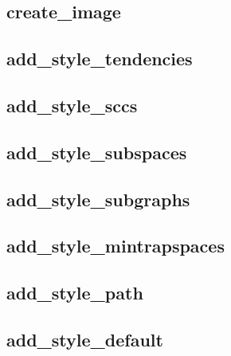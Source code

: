 \documentclass[letterpaper,10pt,english]{sphinxmanual}
\begin{document}
\subsection{create\_image}
\label{\detokenize{StateTransitionGraphs:create-image}}\label{\detokenize{StateTransitionGraphs:stgs-create-image}}

\subsection{add\_style\_tendencies}
\label{\detokenize{StateTransitionGraphs:id22}}\label{\detokenize{StateTransitionGraphs:add-style-tendencies}}

\subsection{add\_style\_sccs}
\label{\detokenize{StateTransitionGraphs:add-style-sccs}}\label{\detokenize{StateTransitionGraphs:stgs-add-style-sccs}}

\subsection{add\_style\_subspaces}
\label{\detokenize{StateTransitionGraphs:add-style-subspaces}}\label{\detokenize{StateTransitionGraphs:id23}}

\subsection{add\_style\_subgraphs}
\label{\detokenize{StateTransitionGraphs:add-style-subgraphs}}\label{\detokenize{StateTransitionGraphs:stgs-add-style-subgraphs}}

\subsection{add\_style\_mintrapspaces}
\label{\detokenize{StateTransitionGraphs:add-style-mintrapspaces}}\label{\detokenize{StateTransitionGraphs:id24}}

\subsection{add\_style\_path}
\label{\detokenize{StateTransitionGraphs:stgs-add-style-path}}\label{\detokenize{StateTransitionGraphs:add-style-path}}

\subsection{add\_style\_default}
\label{\detokenize{StateTransitionGraphs:add-style-default}}\label{\detokenize{StateTransitionGraphs:stgs-add-style-default}}
\end{document}
